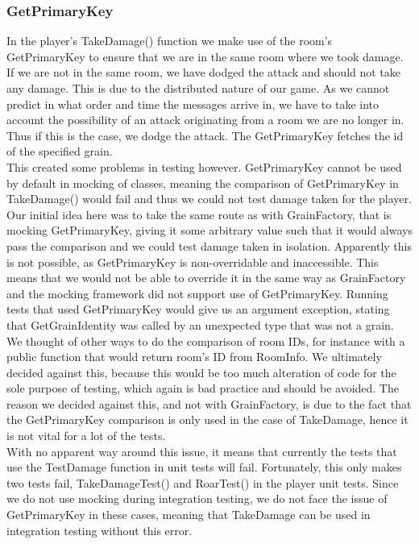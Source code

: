 \subsubsection{GetPrimaryKey} \label{getPrimaryKey}
In the player's TakeDamage() function we make use of the room's GetPrimaryKey to ensure that we are in the same room where we took damage. If we are not in the same room, we have dodged the attack and should not take any damage. This is due to the distributed nature of our game. As we cannot predict in what order and time the messages arrive in, we have to take into account the possibility of an attack originating from a room we are no longer in. Thus if this is the case, we dodge the attack. The GetPrimaryKey fetches the id of the specified grain. \\
This created some problems in testing however. GetPrimaryKey cannot be used by default in mocking of classes, meaning the comparison of GetPrimaryKey in TakeDamage() would fail and thus we could not test damage taken for the player. \\
Our initial idea here was to take the same route as with GrainFactory, that is mocking GetPrimaryKey, giving it some arbitrary value such that it would always pass the comparison and we could test damage taken in isolation. Apparently this is not possible, as GetPrimaryKey is non-overridable and inaccessible. This means that we would not be able to override it in the same way as GrainFactory and the mocking framework did not support use of GetPrimaryKey. Running tests that used GetPrimaryKey would give us an argument exception, stating that GetGrainIdentity was called by an unexpected type that was not a grain. We thought of other ways to do the comparison of room IDs, for instance with a public function that would return room's ID from RoomInfo. We ultimately decided against this, because this would be too much alteration of code for the sole purpose of testing, which again is bad practice and should be avoided. The reason we decided against this, and not with GrainFactory, is due to the fact that the GetPrimaryKey comparison is only used in the case of TakeDamage, hence it is not vital for a lot of the tests. \\
With no apparent way around this issue, it means that currently the tests that use the TestDamage function in unit tests will fail. Fortunately, this only makes two tests fail, TakeDamageTest() and RoarTest() in the player unit tests. Since we do not use mocking during integration testing, we do not face the issue of GetPrimaryKey in these cases, meaning that TakeDamage can be used in integration testing without this error. 
